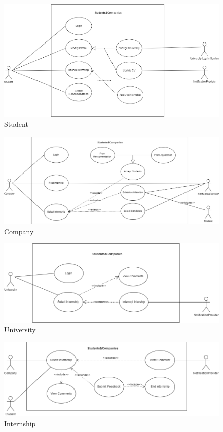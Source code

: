 \documentclass{article}
\begin{document}
\begin{figure}[H]
    \centering
    \includegraphics[scale = 0.45]{figures/UseCasesDiagrams/Student.drawio.png}
    \caption{Student}
    \centering
\end{figure}
\begin{figure}[H]
    \centering
    \includegraphics[scale = 0.4]{figures/UseCasesDiagrams/Company.drawio.png}
    \caption{Company}
    \centering
\end{figure}
\begin{figure}[H]
    \centering
    \includegraphics[scale = 0.45]{figures/UseCasesDiagrams/use_case_1-University.drawio.png}
    \caption{University}
    \centering
\end{figure}
\begin{figure}[H]
    \centering
    \includegraphics[scale = 0.45]{figures/UseCasesDiagrams/use_case_1-Student - Company.drawio.png}
    \caption{Internship}
    \centering
\end{figure}
\newpage
\end{document}
